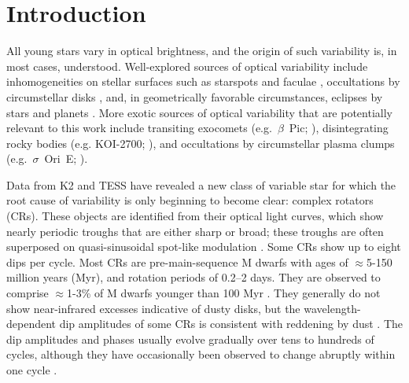 \documentclass[11pt,twocolumn,tighten]{aastex63}
\begin{document}


\section{Introduction}
\label{sec:intro}

All young stars vary in optical brightness, and the origin of such
variability is, in most cases, understood.  Well-explored sources of
optical variability include inhomogeneities on stellar surfaces such
as starspots and faculae \citep[e.g.][]{2021isma.book.....B},
occultations by circumstellar disks
\citep[e.g.][]{2017MNRAS.470..202B}, and, in geometrically favorable
circumstances, eclipses by stars and planets
\citep[e.g.][]{2020AJ....160...33R}.  More exotic sources of optical
variability that are potentially relevant to this work include
transiting exocomets (e.g.~$\beta$~Pic;
\citealt{2019A&A...625L..13Z}), disintegrating rocky bodies (e.g.
KOI-2700; \citealt{2014ApJ...784...40R}), and occultations by
circumstellar plasma clumps (e.g.~$\sigma$~Ori~E;
\citealt{2005ApJ...630L..81T,2005MNRAS.357..251T}).

Data from K2 \citep{2014PASP..126..398H} and TESS
\citep{2015JATIS...1a4003R} have revealed a new class of variable
star for which the root cause of variability is only beginning to
become clear: complex rotators (CRs).  These objects
are identified from their optical light curves, which show nearly
periodic troughs that are either sharp or broad; these troughs are
often superposed on quasi-sinusoidal spot-like modulation
\citep{2017AJ....153..152S,2018AJ....155...63S,2019ApJ...876..127Z}.
Some CRs show up to eight dips per cycle.  Most CRs are
pre-main-sequence M dwarfs with ages of $\approx$5-150 million years
(Myr), and rotation periods of 0.2--2 days.  They are observed to
comprise $\approx$1-3\% of M dwarfs younger than 100 Myr
\citep{2016AJ....152..114R,2022AJ....163..144G}.  They generally do
not show near-infrared excesses indicative of dusty disks, but the
wavelength-dependent dip amplitudes of some CRs is consistent with
reddening by dust
\citep{2017PASJ...69L...2O,2020AJ....160...86B,2022AJ....163..144G,2023MNRAS.518.2921K}.
The dip amplitudes and phases usually evolve gradually over tens to
hundreds of cycles, although they have occasionally been observed to
change abruptly within one cycle
\citep[e.g.][]{2017AJ....153..152S,2022ApJ...925...75P,2023ApJ...945..114P}.
\end{document}
